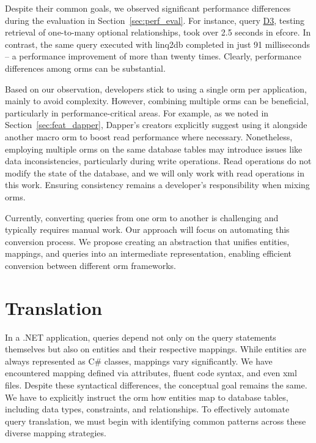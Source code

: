 Despite their common goals, we observed significant performance differences during the evaluation in Section~\ref{sec:perf_eval}. For instance, query \hyperref[query:d3]{D3}, testing retrieval of one-to-many optional relationships, took over 2.5 seconds in \acrshort{efcore}. In contrast, the same query executed with linq2db completed in just 91 milliseconds -- a performance improvement of more than twenty times. Clearly, performance differences among \acrshort{orm}s can be substantial.

Based on our observation, developers stick to using a single \acrshort{orm} per application, mainly to avoid complexity. However, combining multiple \acrshort{orm}s can be beneficial, particularly in performance-critical areas. For example, as we noted in Section~\ref{sec:feat_dapper}, Dapper's creators explicitly suggest using it alongside another macro \acrshort{orm} to boost read performance where necessary. Nonetheless, employing multiple \acrshort{orm}s on the same database tables may introduce issues like data inconsistencies, particularly during write operations. Read operations do not modify the state of the database, and we will only work with read operations in this work. Ensuring consistency remains a developer's responsibility when mixing \acrshort{orm}s.

Currently, converting queries from one \acrshort{orm} to another is challenging and typically requires manual work. Our approach will focus on automating this conversion process. We propose creating an abstraction that unifies entities, mappings, and queries into an intermediate representation, enabling efficient conversion between different \acrshort{orm} frameworks.

\section{Translation}

In a .NET application, queries depend not only on the query statements themselves but also on entities and their respective mappings. While entities are always represented as C\# classes, mappings vary significantly. We have encountered mapping defined via attributes, fluent code syntax, and even \acrshort{xml} files. Despite these syntactical differences, the conceptual goal remains the same. We have to explicitly instruct the \acrshort{orm} how entities map to database tables, including data types, constraints, and relationships. To effectively automate query translation, we must begin with identifying common patterns across these diverse mapping strategies.

